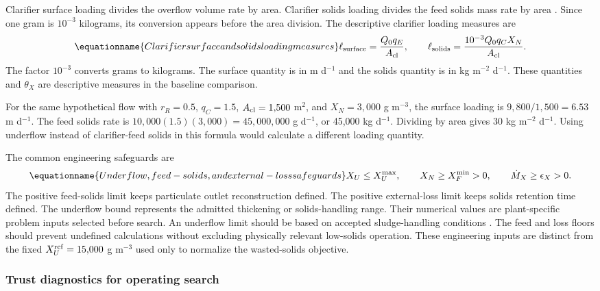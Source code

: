 Clarifier surface loading divides the overflow volume rate by area. Clarifier solids loading divides the feed solids mass rate by area \citep{Henze2008}. Since one gram is $10^{-3}$ kilograms, its conversion appears before the area division. The descriptive clarifier loading measures are
\begin{equation}
\equationname{Clarifier surface and solids loading measures}
\ell_{\rm surface}=\frac{Q_0q_E}{A_{\rm cl}},\qquad
\ell_{\rm solids}=\frac{10^{-3}Q_0q_CX_N}{A_{\rm cl}}.
\label{eq:plant_loading_measures}
\end{equation}
The factor $10^{-3}$ converts grams to kilograms. The surface quantity is in m d$^{-1}$ and the solids quantity is in kg m$^{-2}$ d$^{-1}$. These quantities and $\theta_X$ are descriptive measures in the baseline comparison.

For the same hypothetical flow with $r_R=0.5$, $q_C=1.5$, $A_{\rm cl}=1{,}500$ m$^2$, and $X_N=3{,}000$ g m$^{-3}$, the surface loading is $9{,}800/1{,}500=6.53$ m d$^{-1}$. The feed solids rate is $10{,}000(1.5)(3{,}000)=45{,}000{,}000$ g d$^{-1}$, or 45{,}000 kg d$^{-1}$. Dividing by area gives 30 kg m$^{-2}$ d$^{-1}$. Using underflow instead of clarifier-feed solids in this formula would calculate a different loading quantity.

The common engineering safeguards are
\begin{equation}
\equationname{Underflow, feed-solids, and external-loss safeguards}
X_U\le X_U^{\max},\qquad X_N\ge X_F^{\min}>0,\qquad
\dot M_X\ge\epsilon_X>0.
\label{eq:plant_engineering_safeguards}
\end{equation}
The positive feed-solids limit keeps particulate outlet reconstruction defined. The positive external-loss limit keeps solids retention time defined. The underflow bound represents the admitted thickening or solids-handling range. Their numerical values are plant-specific problem inputs selected before search. An underflow limit should be based on accepted sludge-handling conditions \citep{Henze2008}. The feed and loss floors should prevent undefined calculations without excluding physically relevant low-solids operation. These engineering inputs are distinct from the fixed $X_U^{\rm ref}=15{,}000$ g m$^{-3}$ used only to normalize the wasted-solids objective.

\subsubsection{Trust diagnostics for operating search}

